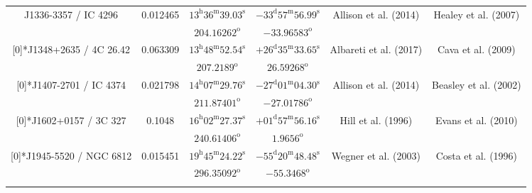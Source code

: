 \begin{landscape}
\begin{longtable}{cccccc}
  \multirow{2}[0]{*}{J1336-3357 / IC 4296} & \multirow{2}[0]{*}{0.012465} &  
    $13^\text{h}36^\text{m}39.03^\text{s}$  & $-33^\text{d}57^\text{m}56.99^\text{s}$  & 
    \multirow{2}[0]{*}{Allison et al. (2014) \cite{RedRef23_2014}}& \multirow{2}[0]{*}{Healey et al. (2007)\cite{CoordRef54_2007}} \\*
     & & $204.16262^\text{o}$ & $-33.96583^\text{o}$ & & \\ \addlinespace 

  \multirow{2}[0]{*}{J1348+2635 / 4C 26.42} & \multirow{2}[0]{*}{0.063309} &  
    $13^\text{h}48^\text{m}52.54^\text{s} $  & $+26^\text{d}35^\text{m}33.65^\text{s} $  & 
    \multirow{2}[0]{*}{Albareti et al. (2017)\cite{RedRef9_2017}}& \multirow{2}[0]{*}{Cava et al. (2009)\cite{CoordRef56_2009}} \\*
    & & $207.2189^\text{o}$ & $26.59268^\text{o}$ & & \\ \addlinespace 

 
  \multirow{2}[0]{*}{J1407-2701 / IC 4374} & \multirow{2}[0]{*}{0.021798} &  
    $14^\text{h}07^\text{m}29.76^\text{s}$  & $-27^\text{d}01^\text{m}04.30^\text{s}$  & 
    \multirow{2}[0]{*}{Allison et al. (2014) \cite{RedRef23_2014}}& \multirow{2}[0]{*}{Beasley et al. (2002)\cite{CoordRef4_2002}} \\*
    & & $211.87401^\text{o}$ & $-27.01786^\text{o}$ & & \\ \addlinespace 



 \multirow{2}[0]{*}{J1602+0157 / 3C 327} & \multirow{2}[0]{*}{0.1048} &  
    $16^\text{h}02^\text{m}27.37^\text{s}$  & $+01^\text{d}57^\text{m}56.16^\text{s}$  & 
    \multirow{2}[0]{*}{Hill et al. (1996)\cite{RedRef67_1996}}& \multirow{2}[0]{*}{Evans et al. (2010)\cite{CoordRef1_2010}} \\*
      & & $240.61406^\text{o}$ & $1.9656^\text{o}$ & & \\ \addlinespace 

 
 \multirow{2}[0]{*}{J1945-5520 / NGC 6812} & \multirow{2}[0]{*}{0.015451} &  
    $19^\text{h}45^\text{m}24.22^\text{s}$  & $ -55^\text{d}20^\text{m}48.48^\text{s}$  & 
    \multirow{2}[0]{*}{Wegner et al. (2003)\cite{RedRef72_2003}}& \multirow{2}[0]{*}{Costa et al. (1996)\cite{CoordRef72_1996}} \\*
    & & $296.35092^\text{o}$ & $-55.3468^\text{o}$ & & \\ \addlinespace 
  

\end{longtable}
\end{landscape}

